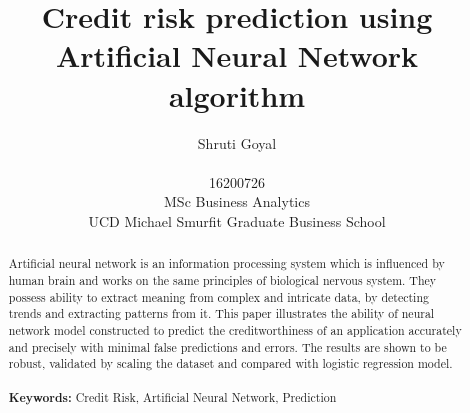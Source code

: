 \documentclass{article}[]
\begin{document}
\title{{\bf Credit risk prediction using Artificial Neural Network algorithm}\\ }

\author{Shruti Goyal\\ \vspace{0.4cm}\\ 
 16200726 \vspace{0.1cm}\\ MSc Business Analytics \vspace{0.1cm}\\ 
 UCD Michael Smurfit Graduate Business School}

\date{}
\maketitle
\begin{abstract}
  Artificial neural network is an information processing system which is influenced by human brain and works on the same principles of biological nervous system. They possess ability to extract meaning from complex and intricate data, by detecting trends and extracting patterns from it. This paper illustrates the ability of neural network model constructed to predict the creditworthiness of an application accurately and precisely with minimal false predictions and errors. The results are shown to be robust, validated by scaling the dataset and compared with logistic regression model. \\ \\
  \textbf{Keywords:} Credit Risk, Artificial Neural Network, Prediction
\end{abstract}
\end{document}
